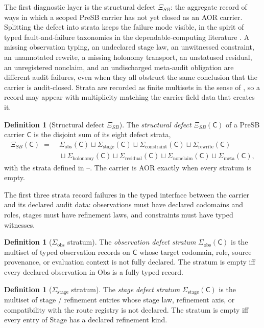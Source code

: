\documentclass[11pt]{article}
\newcommand{\XiSB}{\Xi_{SB}}
\newcommand{\Sigobs}{\Sigma_{\mathrm{obs}}}
\newcommand{\Sigstage}{\Sigma_{\mathrm{stage}}}
\newcommand{\Sigconstr}{\Sigma_{\mathrm{constraint}}}
\newcommand{\Sigrewrite}{\Sigma_{\mathrm{rewrite}}}
\newcommand{\Sighol}{\Sigma_{\mathrm{holonomy}}}
\newcommand{\Sigres}{\Sigma_{\mathrm{residual}}}
\newcommand{\Signon}{\Sigma_{\mathrm{nonclaim}}}
\newcommand{\Sigmeta}{\Sigma_{\mathrm{meta}}}
\theoremstyle{definition}
\newtheorem{definition}[theorem]{Definition}
\begin{document}
The first diagnostic layer is the structural defect \(\XiSB\): the
aggregate record of ways in which a scoped PreSB carrier has not yet
closed as an AOR carrier.  Splitting the defect into strata keeps the
failure mode visible, in the spirit of typed fault-and-failure
taxonomies in the dependable-computing literature
\citep{Avizienis2004Dependability}.  A missing observation typing, an
undeclared stage law, an unwitnessed constraint, an unannotated
rewrite, a missing holonomy transport, an unstatused residual, an
unregistered nonclaim, and an undischarged meta-audit obligation are
different audit failures, even when they all obstruct the same
conclusion that the carrier is audit-closed.  Strata are recorded as
finite multisets in the sense of \citet{Blizard1989Multiset}, so a
record may appear with multiplicity matching the carrier-field data
that creates it.

\begin{definition}[Structural defect $\XiSB$]\label{def:aor:xi-sb}
The \emph{structural defect} $\XiSB(\mathsf C)$ of a PreSB carrier
$\mathsf C$ is the disjoint sum of its eight defect strata,
\begin{align*}
  \XiSB(\mathsf C)
  \;=\;& \Sigobs(\mathsf C) \sqcup \Sigstage(\mathsf C) \sqcup \Sigconstr(\mathsf C) \sqcup \Sigrewrite(\mathsf C) \\
  & {} \sqcup \Sighol(\mathsf C) \sqcup \Sigres(\mathsf C) \sqcup \Signon(\mathsf C) \sqcup \Sigmeta(\mathsf C),
\end{align*}
with the strata defined in --.
The carrier is AOR exactly when every stratum is empty.
\end{definition}

The first three strata record failures in the typed interface between the
carrier and its declared audit data: observations must have declared
codomains and roles, stages must have refinement laws, and constraints must
have typed witnesses.

\begin{definition}[$\Sigobs$ stratum]\label{def:aor:sigma-obs}
The \emph{observation defect stratum} $\Sigobs(\mathsf C)$ is the
multiset of typed observation records on $\mathsf C$ whose target
codomain, role, source provenance, or evaluation context is not fully
declared.  The stratum is empty iff every declared observation in
$\mathrm{Obs}$ is a fully typed record.
\end{definition}

\begin{definition}[$\Sigstage$ stratum]\label{def:aor:sigma-stage}
The \emph{stage defect stratum} $\Sigstage(\mathsf C)$ is the multiset
of stage / refinement entries whose stage law, refinement axis, or
compatibility with the route registry is not declared.  The stratum is
empty iff every entry of $\mathrm{Stage}$ has a declared refinement
kind.
\end{definition}
\end{document}
